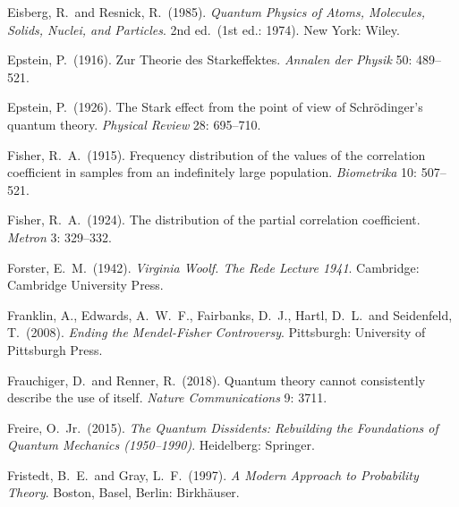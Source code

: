 \documentclass[12pt]{article}
\numberwithin{equation}{section}
\begin{document}
\begin{thebibliography}{}
 Eisberg, R.\ and Resnick, R.\ (1985). \emph{Quantum Physics of Atoms, Molecules, Solids, Nuclei, and Particles}. 2nd ed.\ (1st ed.: 1974). New York: Wiley.   

 Epstein, P.\ (1916). Zur Theorie des Starkeffektes. \emph{Annalen der Physik} 50: 489--521.

 Epstein, P.\ (1926). The Stark effect from the point of view of Schr\"odinger's quantum theory. \emph{Physical Review} 28: 695--710.



  Fisher, R.\ A.\ (1915). Frequency distribution of the values of the correlation coefficient in samples from an indefinitely large population. \emph{Biometrika} 10: 507--521.

  Fisher, R.\ A.\ (1924). The distribution of the partial correlation coefficient. \emph{Metron} 3: 329--332. 

 Forster, E.\ M.\ (1942). \emph{Virginia Woolf. The Rede Lecture 1941}. Cambridge: Cambridge University Press.

  Franklin, A., Edwards, A.\ W.\ F., Fairbanks, D.\ J., Hartl, D.\ L.\ and Seidenfeld, T.\ (2008).  \emph{Ending the Mendel-Fisher Controversy}. Pittsburgh: University of Pittsburgh Press.

 Frauchiger, D.\ and Renner, R.\ (2018). Quantum theory cannot
consistently describe the use of itself. \emph{Nature Communications} 9: 3711.

 Freire, O.\ Jr.\ (2015). \emph{The Quantum Dissidents: Rebuilding the Foundations of Quantum Mechanics (1950--1990)}. Heidelberg: Springer.

  Fristedt, B.\ E.\ and Gray, L.\ F.\ (1997). \emph{A Modern Approach to Probability Theory}. Boston, Basel, Berlin: Birkh\"auser. 


\end{thebibliography}
\end{document}
